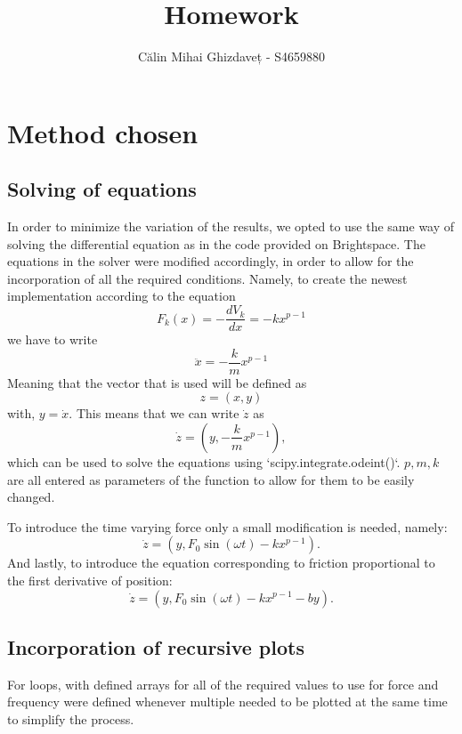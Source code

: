 \documentclass[a4paper]{article}
\author{Călin Mihai Ghizdaveț - S4659880}
\title{Homework}
\begin{document}
\maketitle
\section*{Method chosen}
\subsection*{Solving of equations}
In order to minimize the variation of the results, we opted to use the same way of solving the differential equation as in the code provided on Brightspace.
The equations in the solver were modified accordingly, in order to allow for the incorporation of all the required conditions.
Namely, to create the newest implementation according to the equation
\begin{equation}
F_{k}(x) = - \frac{dV_{k}}{dx} = -kx^{p-1}
\end{equation}
we have to write
\begin{equation}
\ddot{x} = - \frac{k}{m} x^{p-1}
\end{equation}
Meaning that the vector that is used will be defined as
\begin{equation}
z = (x,y)
\end{equation}
with, $y =\dot{x}$. This means that we can write $\dot{z}$ as
\begin{equation}
\dot{z} = \left(y, -\frac{k}{m} x^{p-1} \right),
\end{equation}
which can be used to solve the equations using `scipy.integrate.odeint()`. $p,m,k$ are all entered as parameters of the function to allow for them to be easily changed.

To introduce the time varying force only a small modification is needed, namely:
\begin{equation}
\dot{z} = (y, F_{0}\sin(\omega t) - kx^{p-1} ).
\end{equation}
And lastly, to introduce the equation corresponding to friction proportional to the first derivative of position:
\begin{equation}
\dot{z} = (y, F_{0}\sin(\omega t) - kx^{p-1}- b y).
\end{equation}
\subsection*{Incorporation of recursive plots}
For loops, with defined arrays for all of the required values to use for force and frequency were defined whenever multiple needed to be plotted at the same time to simplify the process. 
\end{document}
